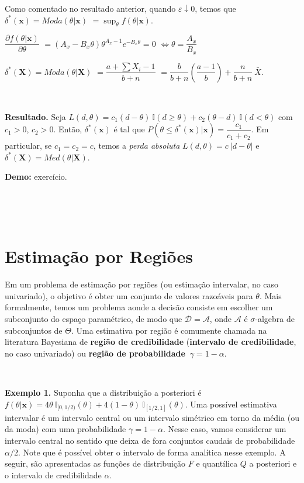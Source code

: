 \documentclass[
]{book}
\begin{document}
Como comentado no resultado anterior, quando \(\varepsilon \downarrow 0\), temos que \({\delta}^*(\boldsymbol x)=Moda(\theta|\boldsymbol x)\) \(= \displaystyle\sup_{\theta} f(\theta|\boldsymbol x)\).

\(\dfrac{\partial f(\theta|\boldsymbol x)}{\partial \theta}\) \(=(A_x-B_x\theta)\theta^{A_x-1}e^{-B_x\theta}=0\) \(\Leftrightarrow \theta =\dfrac{A_x}{B_x}\)

\({\delta}^*(\boldsymbol X) = Moda(\theta|\boldsymbol X)\) \(=\dfrac{a+\sum X_i-1}{b+n}\) \(=\dfrac{b}{b+n}\left(\dfrac{a-1}{b}\right)+\dfrac{n}{b+n}~\bar{X}\).

\(~\)

\textbf{Resultado.} Seja \(L(d,\theta)=c_1(d-\theta)~\mathbb{I}(d\geq \theta)+c_2(\theta-d)~\mathbb{I}(d<\theta)\) com \(c_1>0\), \(c_2 >0\). Então, \({\delta}^*(\boldsymbol{x})\) é tal que \(P\left(\theta\leq {\delta}^*(\boldsymbol{x})\big|\boldsymbol x\right)=\dfrac{c_1}{c_1+c_2}\). Em particular, se \(c_1=c_2=c\), temos a \emph{perda absoluta} \(L(d,\theta)=c~|d-\theta|\) e \({\delta}^*(\boldsymbol{X})=Med(\theta|\boldsymbol X)\).

\textbf{Demo:} exercício.

\(~\)

\(~\)

\hypertarget{estimauxe7uxe3o-por-regiuxf5es}{%
\section{Estimação por Regiões}\label{estimauxe7uxe3o-por-regiuxf5es}}

Em um problema de estimação por regiões (ou estimação intervalar, no caso univariado), o objetivo é obter um conjunto de valores razoáveis para \(\theta\). Mais formalmente, temos um problema aonde a decisão consiste em escolher um subconjunto do espaço paramétrico, de modo que \(\mathcal{D}=\mathcal{A}\), onde \(\mathcal{A}\) é \(\sigma\)-algebra de subconjuntos de \(\Theta\). Uma estimativa por região é comumente chamada na literatura Bayesiana de \textbf{região de credibilidade} (\textbf{intervalo de credibilidade}, no caso univariado) ou \textbf{região de probabilidade} \(~\gamma=1-\alpha\).

\(~\)

\textbf{Exemplo 1.} Suponha que a distribuição a posteriori é \(f(\theta|\boldsymbol{x})=4\theta~\mathbb{I}_{[0,1/2)}(\theta)+4(1-\theta)~\mathbb{I}_{[1/2,1]}(\theta)\). Uma possível estimativa intervalar é um intervalo central ou um intervalo simétrico em torno da média (ou da moda) com uma probabilidade \(\gamma = 1-\alpha\). Nesse caso, vamos considerar um intervalo central no sentido que deixa de fora conjuntos caudais de probabilidade \(\alpha/2\). Note que é possível obter o intervalo de forma analítica nesse exemplo. A seguir, são apresentadas as funções de distribuição \(F\) e quantílica \(Q\) a posteriori e o intervalo de credibilidade \(\alpha\).
\end{document}
